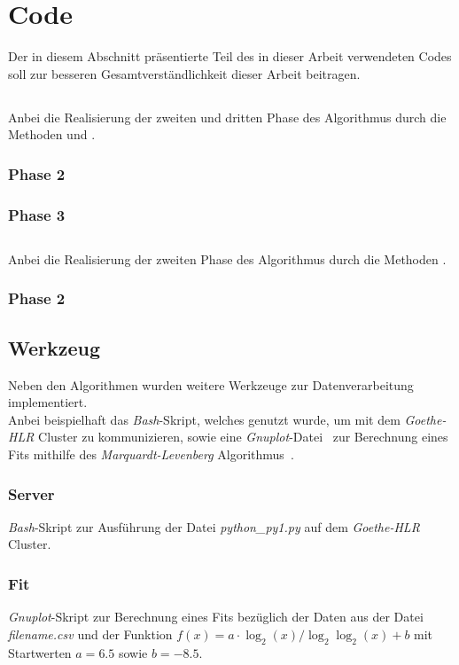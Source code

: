 \section{Code}		%
Der in diesem Abschnitt präsentierte Teil des in dieser Arbeit verwendeten Codes soll zur besseren Gesamtverständlichkeit dieser Arbeit beitragen.

\subsection{\Rm}
Anbei die Realisierung der zweiten und dritten Phase des Algorithmus \Rm durch die Methoden  und .

\subsubsection{Phase 2}

\subsubsection{Phase 3}


\newpage
\subsection{\RM}
Anbei die Realisierung der zweiten Phase des Algorithmus \RM durch die Methoden .
\subsubsection{Phase 2}


\newpage
\subsection{Werkzeug}
Neben den Algorithmen wurden weitere Werkzeuge zur Datenverarbeitung implementiert.\\[.05cm]
Anbei beispielhaft das \textit{Bash}-Skript, welches genutzt wurde, um mit dem \textit{Goethe-HLR} Cluster zu kommunizieren, sowie eine \textit{Gnuplot}-Datei~\cite{gnu} zur Berechnung eines Fits mithilfe des \textit{Marquardt-Levenberg} Algorithmus~\cite{gnu2}. 
\subsubsection{Server}
\textit{Bash}-Skript zur Ausführung der Datei \textit{python\_py1.py} auf dem \textit{Goethe-HLR} Cluster.

\subsubsection{Fit}
\textit{Gnuplot}-Skript zur Berechnung eines Fits bezüglich der Daten aus der Datei \textit{filename.csv} und der Funktion $f(x)=a\cdot \log_2(x)/\log_2\log_2(x) + b$ mit Startwerten $a=6.5$ sowie $b=-8.5$.


